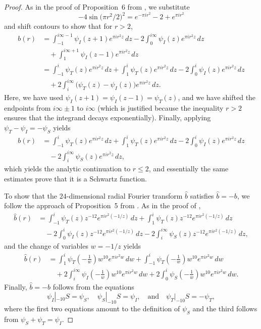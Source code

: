 \documentclass{aomart}
\theoremstyle{plain}
\numberwithin{theorem}{section}
\numberwithin{equation}{section}
\begin{document}
\begin{proof}
As in the proof of Proposition~6 from \cite{V}, we substitute
\[
-4\sin\mathopen{}\big(\pi r^2/2\big)^2\mathclose{} = e^{-\pi i r^2} - 2 +
e^{\pi i r^2}
\]
and shift contours to show that for $r>2$,
\begin{align*}
b(r) & = \int_{-1}^{i\infty-1} \psi_I(z+1) e^{\pi i r^2 z} \, dz - 2 \int_0^{i \infty} \psi_I(z) e^{\pi i r^2 z} \, dz\\
& \quad \phantom{} + \int_1^{i \infty+1} \psi_I(z-1) e^{\pi i r^2 z} \, dz\\
&=
\int_{-1}^i \psi_T(z) e^{\pi i r^2 z} \, dz + \int_{1}^i \psi_T(z) e^{\pi i r^2 z} \, dz - 2\int_{0}^i \psi_I(z) e^{\pi i r^2 z} \, dz\\
& \quad \phantom{} + 2 \int_i^{i\infty} \big(\psi_T(z)-\psi_I(z)\big) e^{\pi i r^2 z} \, dz.
\end{align*}
Here, we have used $\psi_I(z+1) = \psi_I(z-1) = \psi_T(z)$, and we have
shifted the endpoints from $i \infty \pm 1$ to $i \infty$ (which is
justified because the inequality $r>2$ ensures that the integrand decays
exponentially).  Finally, applying $\psi_T - \psi_I = -\psi_S$ yields
\begin{align*}
b(r) & =
\int_{-1}^i \psi_T(z) e^{\pi i r^2 z} \, dz + \int_{1}^i \psi_T(z) e^{\pi i r^2 z} \, dz - 2\int_{0}^i \psi_I(z) e^{\pi i r^2 z} \, dz\\
& \quad \phantom{} - 2 \int_i^{i\infty} \psi_S(z) e^{\pi i r^2 z} \, dz,
\end{align*}
which yields the analytic continuation to $r \le 2$, and essentially the
same estimates prove that it is a Schwartz function.

To show that the $24$-dimensional radial Fourier transform $\widehat{b}$
satisfies ${\widehat{b}=-b}$, we follow the approach of Proposition~5 from
\cite{V}.  As in the proof of ,
\begin{align*}
\widehat{b}(r) & =
\int_{-1}^i \psi_T(z) z^{-12} e^{\pi i r^2 (-1/z)} \, dz + \int_{1}^i \psi_T(z) z^{-12} e^{\pi i r^2 (-1/z)} \, dz\\
& \quad \phantom{} - 2\int_{0}^i \psi_I(z) z^{-12} e^{\pi i r^2 (-1/z)} \, dz - 2 \int_i^{i\infty} \psi_S(z) z^{-12} e^{\pi i r^2 (-1/z)} \, dz,
\end{align*}
and the change of variables $w=-1/z$ yields
\begin{align*}
\widehat{b}(r) & =
\int_{1}^i \psi_T\mathopen{}\left(-\frac{1}{w}\right)\mathclose{} w^{10} e^{\pi i r^2 w} \, dw + \int_{-1}^i \psi_T\mathopen{}\left(-\frac{1}{w}\right)\mathclose{} w^{10} e^{\pi i r^2 w} \, dw\\
& \quad \phantom{} + 2\int_{i}^{i \infty} \psi_I\mathopen{}\left(-\frac{1}{w}\right)\mathclose{} w^{10} e^{\pi i r^2 w} \, dw + 2 \int_0^{i} \psi_S\mathopen{}\left(-\frac{1}{w}\right)\mathclose{} w^{10} e^{\pi i r^2 w} \, dw.
\end{align*}
Finally, $\widehat{b}=-b$ follows from the equations
\[
\psi_I|_{-10} S = \psi_S, \quad \psi_S |_{-10} S = \psi_I, \quad \text{and}\quad \psi_T|_{-10} S
= - \psi_T,
\]
where the first two equations amount to the definition of $\psi_S$ and the
third follows from $\psi_S + \psi_T = \psi_I$.
\end{proof}
\end{document}
